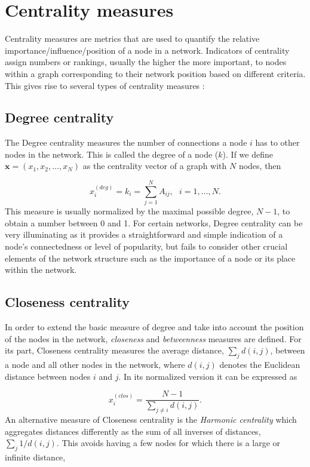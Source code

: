 \section{Centrality measures}
\label{sec:centra}
 Centrality measures are metrics that are used to quantify the relative importance/influence/position of a node in a network. Indicators of centrality assign numbers or rankings, usually the higher the more important, to nodes within a graph corresponding to their network position based on different criteria. This gives rise to several types of centrality measures \cite[Ch.\ 7]{newman2018networks}:

\subsection*{Degree centrality} The Degree centrality measures the number of connections a node $i$ has to other nodes in the network. This is called the degree of a node ($k$). If we define $\mathbf{x}=(x_1,x_2,\dots,x_N)$ as the centrality vector of a graph with $N$ nodes, then 

\begin{equation}
    x_i^{(deg)}=k_i=\sum_{j=1}^{N}A_{ij}, ~~~i = 1,\dots, N.
\end{equation}
This measure is usually normalized by the maximal possible degree, $N − 1$, to obtain a number between 0 and 1. For certain networks, Degree centrality can be very illuminating as it provides a straightforward and simple indication of a node's connectedness or level of popularity, but fails to consider other crucial elements of the network structure such as the importance of a node or its place within the network.

\subsection*{Closeness centrality} In order to extend the basic measure of degree and take into account the position of the nodes in the network, \textit{closeness} and \textit{betweenness} measures are defined. For its part, Closeness centrality measures the average distance, $\sum_{j}^{}d(i,j)$, between a node and all other nodes in the network, where $d(i,j)$ denotes the Euclidean distance between nodes $i$ and $j$. In its normalized version it can be expressed as

\begin{equation}
    x_i^{(clos)}= \frac{N-1}{\sum_{j\ne i}^{}d(i,j)}.
\end{equation}
An alternative measure of Closeness centrality is the \textit{Harmonic centrality} which aggregates distances differently as the sum of all inverses
of distances, $\sum_{j}^{}1/d(i,j)$. This avoids having a few nodes for which there is a large or infinite distance,

